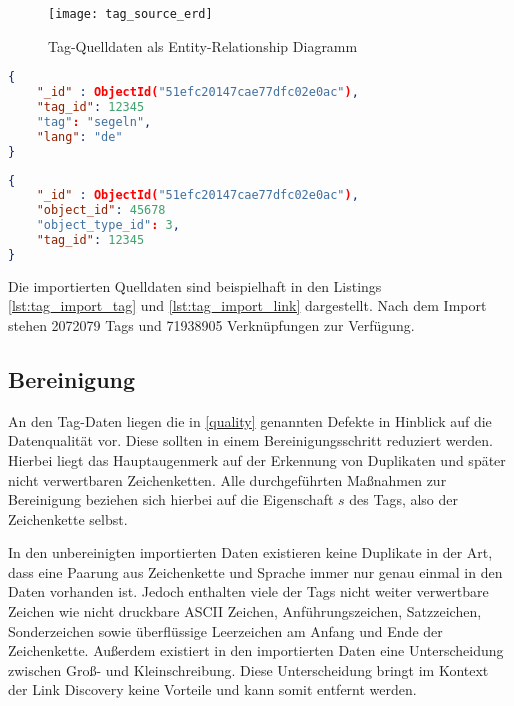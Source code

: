 \begin{figure}
\centering
\texttt{[image: tag\_source\_erd]}
\caption{Tag-Quelldaten als Entity-Relationship Diagramm}
\label{fig:tag_source_erd}
\end{figure}

\begin{lstlisting}[language=json, label={lst:tag_import_tag}, caption={Beispiele für einen importierten Tag}]
{
    "_id" : ObjectId("51efc20147cae77dfc02e0ac"),
    "tag_id": 12345
    "tag": "segeln",
    "lang": "de"
}
\end{lstlisting}

\begin{lstlisting}[language=json, label={lst:tag_import_link}, caption={Beispiele für eine importierte Verknüpfung eines Tags mit einem Dokument}]
{
    "_id" : ObjectId("51efc20147cae77dfc02e0ac"),
    "object_id": 45678
    "object_type_id": 3,
    "tag_id": 12345
}
\end{lstlisting}

Die importierten Quelldaten sind beispielhaft in den Listings \ref{lst:tag_import_tag} und \ref{lst:tag_import_link} dargestellt. Nach dem Import stehen \num{2072079} Tags und \num{71938905} Verknüpfungen zur Verfügung.

\subsection{Bereinigung}

An den Tag-Daten liegen die in \ref{quality} genannten Defekte in Hinblick auf die Datenqualität vor. Diese sollten in einem Bereinigungsschritt reduziert werden. Hierbei liegt das Hauptaugenmerk auf der Erkennung von Duplikaten und später nicht verwertbaren Zeichenketten. Alle durchgeführten Maßnahmen zur Bereinigung beziehen sich hierbei auf die Eigenschaft \(s\) des Tags, also der Zeichenkette selbst.

In den unbereinigten importierten Daten existieren keine Duplikate in der Art, dass eine Paarung aus Zeichenkette und Sprache immer nur genau einmal in den Daten vorhanden ist. Jedoch enthalten viele der Tags nicht weiter verwertbare Zeichen wie nicht druckbare ASCII Zeichen, Anführungszeichen, Satzzeichen, Sonderzeichen sowie überflüssige Leerzeichen am Anfang und Ende der Zeichenkette. Außerdem existiert in den importierten Daten eine Unterscheidung zwischen Groß- und Kleinschreibung. Diese Unterscheidung bringt im Kontext der Link Discovery keine Vorteile und kann somit entfernt werden.

